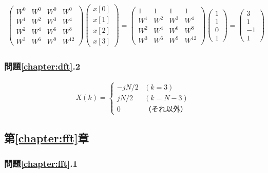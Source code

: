 \begin{eqnarray}
\left( 
\begin{array}{cccc}
W^0 & W^0 & W^0 & W^0 \\
W^1 & W^2 & W^3 & W^4 \\
W^2 & W^4 & W^6 & W^8 \\
W^3 & W^6 & W^9 & W^12
\end{array}
\right)
\left( 
\begin{array}{c}
x[0] \\
x[1] \\
x[2] \\
x[3]
\end{array}
\right) = 
\left( 
\begin{array}{cccc}
1 & 1 & 1 & 1 \\
W^1 & W^2 & W^3 & W^4 \\
W^2 & W^4 & W^6 & W^8 \\
W^3 & W^6 & W^9 & W^{12}
\end{array}
\right)
\left( 
\begin{array}{c}
1 \\
1 \\
0 \\
1
\end{array}
\right) = 
\left( 
\begin{array}{c}
3 \\
1 \\
-1 \\
1
\end{array}
\right) \nonumber
\end{eqnarray}

\subsubsection*{問題\ref{chapter:dft}.2}

\begin{eqnarray}
X(k)=\left \{ 
\begin{array}{cc}
-jN/2 & (k=3) \\
jN/2 & (k=N-3) \\
0 & （それ以外）
\end{array}
\right . \nonumber
\end{eqnarray}


\subsection*{第\ref{chapter:fft}章}

\subsubsection*{問題\ref{chapter:fft}.1}

